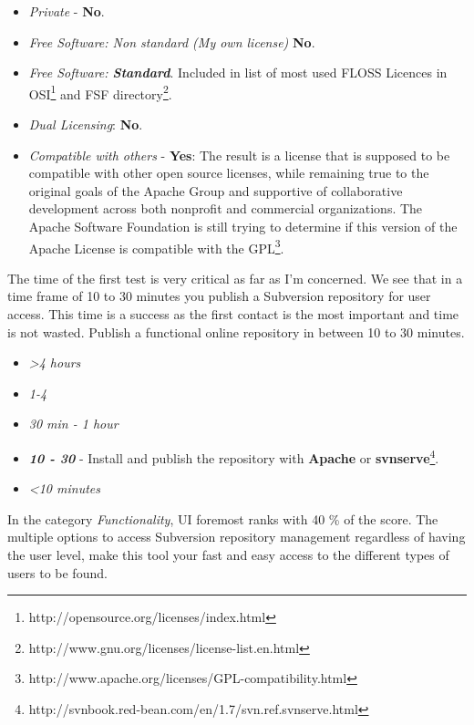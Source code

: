 \documentclass[11pt]{scrartcl}
\begin{document}
\begin{itemize} 
    \item \emph{Private} - \textbf{No}.
    \item \emph{Free Software: Non standard (My own license)} \textbf{No}.
    \item \emph{Free Software: \textbf{Standard}}. Included in list of most used FLOSS Licences in OSI\footnote{http://opensource.org/licenses/index.html} and FSF directory\footnote{http://www.gnu.org/licenses/license-list.en.html}.
    \item \emph{Dual Licensing}: \textbf{No}.
    \item \emph{Compatible with others} - \textbf{Yes}: The result is a license that is supposed to be compatible with other open source licenses, while remaining true to the original goals of the Apache Group and supportive of collaborative development across both nonprofit and commercial organizations. The Apache Software Foundation is still trying to determine if this version of the Apache License is compatible with the GPL\footnote{http://www.apache.org/licenses/GPL-compatibility.html}.
\end{itemize}

\par The time of the first test is very critical as far as I'm concerned. We see that in a time frame of 10 to 30 minutes you publish a Subversion repository for user access. This time is a success as the first contact is the most important and time is not wasted. Publish a functional online repository in between 10 to 30 minutes.

\begin{itemize}
    \item \emph{\textgreater 4 hours}
    \item \emph{1-4} 
    \item \emph{30 min - 1 hour}
    \item \emph{\textbf{10 - 30}} - Install and publish the repository with \textbf{Apache} or \textbf{svnserve}\footnote{http://svnbook.red-bean.com/en/1.7/svn.ref.svnserve.html}.
    \item \emph{\textless 10 minutes}
\end{itemize}

\par In the category \emph{Functionality}, UI foremost ranks with 40 \% of the score. The multiple options to access Subversion repository management regardless of having the user level, make this tool your fast and easy access to the different types of users to be found.
\end{document}
